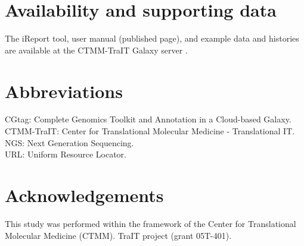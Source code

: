 \section*{Availability and supporting data}
The iReport tool, user manual (published page), and example data and histories are available at the CTMM-TraIT Galaxy server \cite{url-traitgalaxy}.

\section*{Abbreviations}
CGtag: Complete Genomics Toolkit and Annotation in a Cloud-based Galaxy. \\
CTMM-TraIT: Center for Translational Molecular Medicine - Translational IT. \\
NGS: Next Generation Sequencing. \\
URL: Uniform Resource Locator. \\


\section*{Acknowledgements}
 This study was performed within the framework of the Center for Translational Molecular Medicine (CTMM). TraIT project (grant 05T-401).




